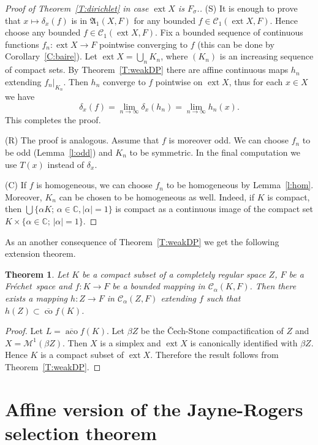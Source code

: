 \documentclass{amsart}
\numberwithin{equation}{section}
\newtheorem{thm}{Theorem}[section]
\theoremstyle{definition}
\def\fra{\mathfrak{A}}
\def\C{\mathcal C}
\def\M{\mathcal M}
\def\ce{\mathbb C}
\def\co{\operatorname{co}}
\def\aco{\operatorname{aco}}
\def\r{|}
\def\ov{\overline}
\def \ext {\operatorname{ext}}
\newcommand{\setsep}{;\,}
\newcommand{\fr}{Fr\'echet\ }
\begin{document}
\begin{proof}[Proof of Theorem~\ref{T:dirichlet} in case $\ext X$ is $F_\sigma$.]
(S) It is enough to prove that $x\mapsto\delta_x(f)$ is in $\fra_1(X,F)$ for any bounded $f\in \C_1(\ext X,F)$.
Hence choose any bounded $f\in\C_1(\ext X,F)$. Fix a bounded sequence of continuous functions $f_n:\ext X\to F$ pointwise converging to $f$ (this can be done by Corollary~\ref{C:baire}). Let $\ext X=\bigcup_n K_n$, where $(K_n)$ is an increasing sequence of compact sets. By Theorem~\ref{T:weakDP} there are affine continuous maps $h_n$ extending $f_n\r_{K_n}$. Then $h_n$ converge to $f$ pointwise on $\ext X$, thus for each $x\in X$
we have
$$\delta_x(f)=\lim_{n\to\infty}\delta_{x}(h_n)=\lim_{n\to\infty} h_n(x).$$
This completes the proof.

(R) The proof is analogous. Assume that $f$ is moreover odd. We can choose $f_n$ to be odd (Lemma~\ref{l:odd}) and $K_n$ to be symmetric.
In the final computation we use $T(x)$ instead of $\delta_x$.

(C) If $f$ is homogeneous, we can choose $f_n$ to be homogeneous by Lemma~\ref{l:hom}. Moreover, $K_n$ can be chosen to be
homogeneous as well. Indeed, if $K$ is compact, then $\bigcup\{\alpha K\setsep \alpha\in\ce,|\alpha|=1\}$ is compact as a continuous image of the compact set $K\times \{\alpha\in\ce\setsep|\alpha|=1\}$.
\end{proof}


As an another consequence of Theorem~\ref{T:weakDP} we get the following extension theorem.

\begin{thm}
\label{T:weak2}
Let $K$ be a compact subset of a completely regular space $Z$, $F$ be a \fr space and $f\colon K\to F$ be a bounded mapping in $\C_\alpha(K,F)$. Then there exists a mapping $h\colon Z\to F$ in $\C_\alpha(Z,F)$ extending $f$ such
that $h(Z)\subset \overline{\co} f(K)$.
\end{thm}

\begin{proof}
Let $L=\ov{\aco} f(K)$. Let $\beta Z$ be the \v{C}ech-Stone compactification of $Z$ and $X=\M^1(\beta Z)$. Then $X$ is  a simplex and $\ext X$ is canonically identified with $\beta Z$. Hence $K$ is a compact subset of $\ext X$. Therefore the result follows from Theorem~\ref{T:weakDP}.
\end{proof}

\section{Affine version of the Jayne-Rogers selection theorem}
\end{document}
